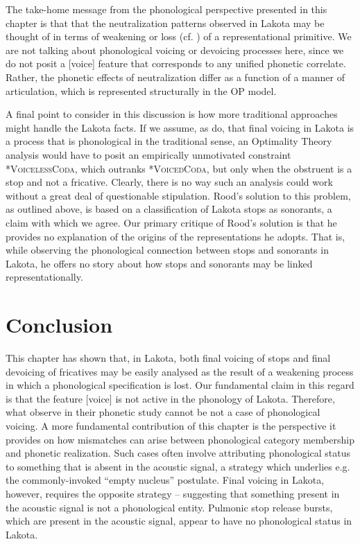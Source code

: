 \documentclass[output=paper]{langscibook}
\begin{document}
\begin{sloppypar}
The take-home message from the phonological perspective presented in this chapter is that that the neutralization patterns observed in Lakota may be thought of in terms of weakening or loss (cf. \citealt{Harris2009}) of a representational primitive. We are not talking about phonological voicing or devoicing processes here, since we do not posit a [voice] feature that corresponds to any unified phonetic correlate. Rather, the phonetic effects of neutralization differ as a function of a manner of articulation, which is represented structurally in the OP model. 
\end{sloppypar}

A final point to consider in this discussion is how more traditional approaches might handle the Lakota facts. If we assume, as \citeauthor{BlevinsEtAl2020} do, that final voicing in Lakota is a process that is phonological in the traditional sense, an Optimality Theory analysis would have to posit an empirically unmotivated constraint *\textsc{VoicelessCoda}, which outranks *\textsc{VoicedCoda}, but only when the obstruent is a stop and not a fricative. Clearly, there is no way such an analysis could work without a great deal of questionable stipulation. Rood’s solution to this problem, as outlined above, is based on a classification of Lakota stops as sonorants, a claim with which we agree. Our primary critique of Rood’s solution is that he provides no explanation of the origins of the representations he adopts. That is, while observing the phonological connection between stops and sonorants in Lakota, he offers no story about how stops and sonorants may be linked representationally.

\section{Conclusion}

This chapter has shown that, in Lakota, both final voicing of stops and final devoicing of fricatives may be easily analysed as the result of a weakening process in which a phonological specification is lost. Our fundamental claim in this regard is that the feature [voice] is not active in the phonology of Lakota. Therefore, what \citet{BlevinsEtAl2020} observe in their phonetic study cannot be not a case of phonological voicing. A more fundamental contribution of this chapter is the perspective it provides on how mismatches can arise between phonological category membership and phonetic realization. Such cases often involve attributing phonological status to something that is absent in the acoustic signal, a strategy which underlies e.g. the commonly-invoked “empty nucleus” postulate. Final voicing in Lakota, however, requires the opposite strategy – suggesting that something present in the acoustic signal is not a phonological entity. Pulmonic stop release bursts, which are present in the acoustic signal, appear to have no phonological status in Lakota. 
\end{document}
